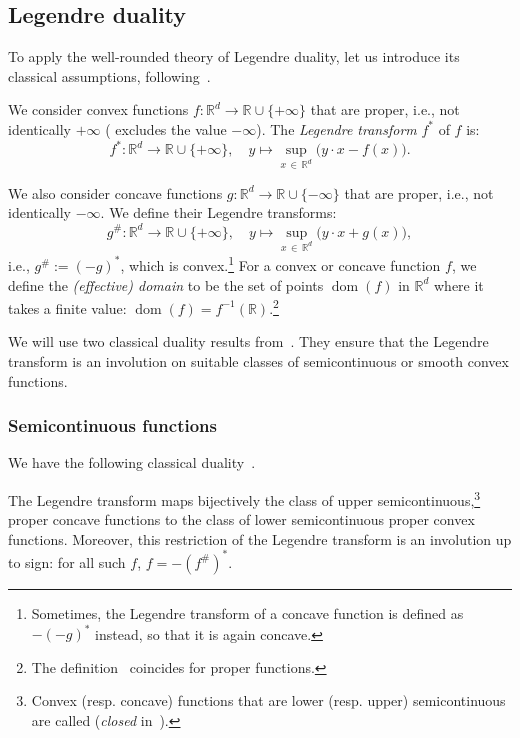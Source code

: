 \documentclass[AHL, Unicode, longabstracts,published]{cedram}
\theoremstyle{plain}
\theoremstyle{plain}
\newcommand\dom{\operatorname{dom}}
\newcommand*\8{\infty}
\newcommand\RR{\mathbb{R}}
\begin{document}
\subsection{Legendre duality}


To apply the well-rounded theory of Legendre duality, let us introduce its classical assumptions, following~\cite{Rockafellar-book}.

We consider convex functions $f:\RR^d\to\RR\cup\{ +\infty\}$ that are proper, i.e., not identically $+\infty$ (\cite[p.~24]{Rockafellar-book} excludes the value $-\infty$). The \emph{Legendre transform} $f^*$ of $f$ is:
\[
f^*:\RR^d\to\RR\cup\{+\infty\},\quad y \mapsto \sup_{x\,\in\,\RR^d} \big(y \cdot x - f(x)\big).
\]


We also consider concave functions $g:\RR^d\to\RR\cup\{ -\infty\}$ that are proper, i.e., not identically $-\infty$. We define their Legendre transforms:
\[
g^{\#}:\RR^d\to\RR\cup\{ +\infty\},\quad y \mapsto \sup_{x\,\in\,\RR^d} \big(y \cdot x + g(x)\big),
\]
i.e., $g^{\#}:=(-g)^*$, which is convex.\footnote{Sometimes, the Legendre transform of a concave function is defined as $-(-g)^*$ instead, so that it is again concave.}
For a convex or concave function $f$, we define the \emph{(effective) domain} to be the set of points $\dom(f)$ in $\RR^d$ where it takes a finite value: $\dom(f)=f^{-1}(\RR)$.\footnote{The definition~\cite[p.~23]{Rockafellar-book} coincides for proper functions.}




We will use two classical duality results from~\cite{Rockafellar-book}. They ensure that the Legendre transform is an involution on suitable classes of semicontinuous or smooth convex functions.


\subsubsection*{Semicontinuous functions}
We have the following classical duality~\cite[Corollary~12.2.1]{Rockafellar-book}.


\begin{theo}\label{theo-duality-CO}
The Legendre transform maps bijectively the class of upper semicontinuous,\footnote{Convex (resp. concave) functions that are lower (resp. upper) semicontinuous are called (\emph{closed} in~\cite[p.~52]{Rockafellar-book}).} proper concave functions to the class of lower semicontinuous proper convex functions. Moreover, this restriction of the Legendre transform is an involution up to sign: for all such $f$, $f=-(f^{\#})^*$.
\end{theo}
\end{document}
